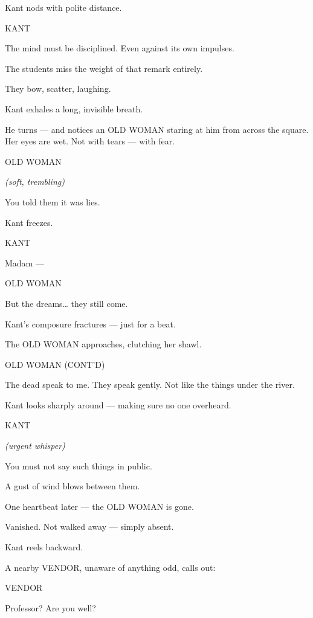 \documentclass[12pt]{article}
\newenvironment{dialogue}[1]{%
  \vspace{0.8\baselineskip}%
  \noindent\hspace*{2.3in}\textsc{#1}\par%
  \noindent\hspace*{1.5in}\begin{minipage}[t]{4.5in}%
}{%
  \end{minipage}\par%
}
\newcommand{\paren}[1]{%
  \noindent\hspace*{1.8in}\textit{(#1)}\par%
}
\begin{document}
Kant nods with polite distance.

\begin{dialogue}{KANT}
The mind must be disciplined.  
Even against its own impulses.
\end{dialogue}

The students miss the weight of that remark entirely.

They bow, scatter, laughing.

Kant exhales a long, invisible breath.

He turns — and notices an OLD WOMAN staring at him from across the square.
Her eyes are wet. Not with tears — with fear.

\begin{dialogue}{OLD WOMAN}
\paren{soft, trembling}
You told them it was lies.
\end{dialogue}

Kant freezes.

\begin{dialogue}{KANT}
Madam —
\end{dialogue}

\begin{dialogue}{OLD WOMAN}
But the dreams…  
they still come.
\end{dialogue}

Kant’s composure fractures — just for a beat.

The OLD WOMAN approaches, clutching her shawl.

\begin{dialogue}{OLD WOMAN (CONT’D)}
The dead speak to me.  
They speak gently.  
Not like the things under the river.
\end{dialogue}

Kant looks sharply around — making sure no one overheard.

\begin{dialogue}{KANT}
\paren{urgent whisper}
You must not say such things in public.
\end{dialogue}

A gust of wind blows between them.

One heartbeat later — the OLD WOMAN is gone.

Vanished. Not walked away — simply absent.

Kant reels backward.

A nearby VENDOR, unaware of anything odd, calls out:

\begin{dialogue}{VENDOR}
Professor? Are you well?
\end{dialogue}
\end{document}
